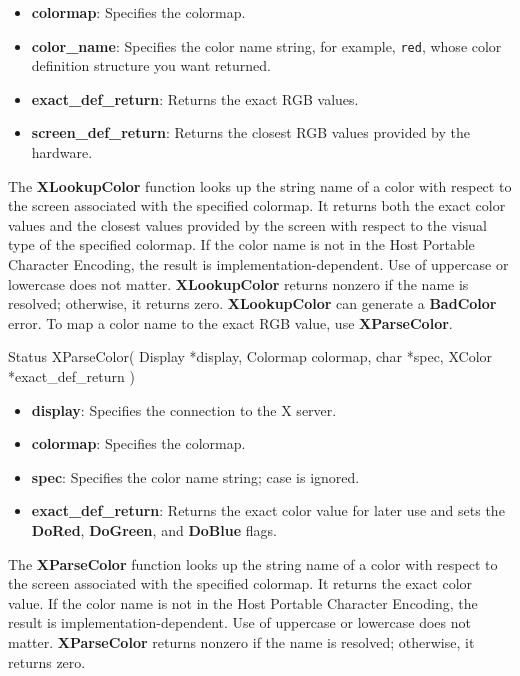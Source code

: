 \documentclass{report}
\begin{document}
\begin{itemize}
\begin{itemize}
                \item \textbf{colormap}: Specifies the colormap.
                \item \textbf{color\_name}: Specifies the color name string, for example, \texttt{red}, whose color definition structure you want returned.
                \item \textbf{exact\_def\_return}: Returns the exact RGB values.
                \item \textbf{screen\_def\_return}: Returns the closest RGB values provided by the hardware.
            \end{itemize}
            \bigbreak \noindent
            The \textbf{XLookupColor} function looks up the string name of a color with respect to the screen associated with the specified colormap. It returns both the exact color values and the closest values provided by the screen with respect to the visual type of the specified colormap. If the color name is not in the Host Portable Character Encoding, the result is implementation-dependent. Use of uppercase or lowercase does not matter. \textbf{XLookupColor} returns nonzero if the name is resolved; otherwise, it returns zero.
            \bigbreak \noindent
            \textbf{XLookupColor} can generate a \textbf{BadColor} error.
            \bigbreak \noindent
            To map a color name to the exact RGB value, use \textbf{XParseColor}.
            \bigbreak \noindent
            \begin{cppcode}
                Status XParseColor(
                    Display *display,
                    Colormap colormap,
                    char *spec,
                    XColor *exact_def_return
                )
            \end{cppcode}
            \bigbreak \noindent
            \begin{itemize}
                \item \textbf{display}: Specifies the connection to the X server.
                \item \textbf{colormap}: Specifies the colormap.
                \item \textbf{spec}: Specifies the color name string; case is ignored.
                \item \textbf{exact\_def\_return}: Returns the exact color value for later use and sets the \textbf{DoRed}, \textbf{DoGreen}, and \textbf{DoBlue} flags.
            \end{itemize}
            \bigbreak \noindent
            The \textbf{XParseColor} function looks up the string name of a color with respect to the screen associated with the specified colormap. It returns the exact color value. If the color name is not in the Host Portable Character Encoding, the result is implementation-dependent. Use of uppercase or lowercase does not matter. \textbf{XParseColor} returns nonzero if the name is resolved; otherwise, it returns zero.

\end{itemize}
\end{document}
